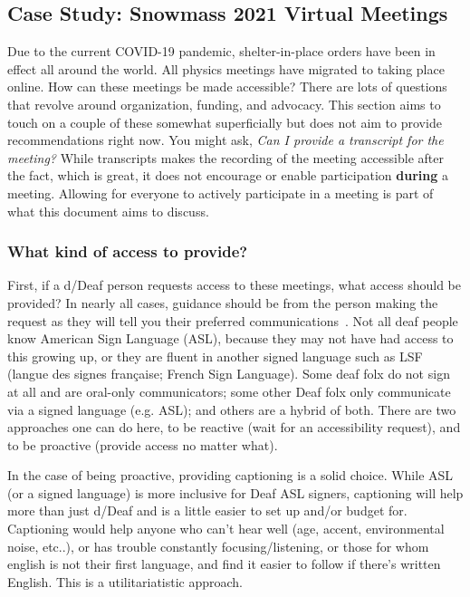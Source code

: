 \documentclass{article}
\begin{document}
  \subsection{Case Study: Snowmass 2021 Virtual Meetings}

  Due to the current COVID-19 pandemic, shelter-in-place orders have been in effect all around the world. All physics meetings have migrated to taking place online. How can these meetings be made accessible? There are lots of questions that revolve around organization, funding, and advocacy. This section aims to touch on a couple of these somewhat superficially but does not aim to provide recommendations right now. You might ask, \textsl{Can I provide a transcript for the meeting?} While transcripts makes the recording of the meeting accessible after the fact, which is great, it does not encourage or enable participation \textbf{during} a meeting. Allowing for everyone to actively participate in a meeting is part of what this document aims to discuss.

  \subsubsection{What kind of access to provide?}

  First, if a d/Deaf person requests access to these meetings, what access should be provided? In nearly all cases, guidance should be from the person making the request as they will tell you their preferred communications~\cite{chua2017behind}. Not all deaf people know American Sign Language (ASL), because they may not have had access to this growing up, or they are fluent in another signed language such as LSF (langue des signes française; French Sign Language). Some deaf folx do not sign at all and are oral-only communicators; some other Deaf folx only communicate via a signed language (e.g. ASL); and others are a hybrid of both. There are two approaches one can do here, to be reactive (wait for an accessibility request), and to be proactive (provide access no matter what).

  In the case of being proactive, providing captioning is a solid choice. While ASL (or a signed language) is more inclusive for Deaf ASL signers, captioning will help more than just d/Deaf and is a little easier to set up and/or budget for. Captioning would help anyone who can't hear well (age, accent, environmental noise, etc..), or has trouble constantly focusing/listening, or those for whom english is not their first language, and find it easier to follow if there's written English. This is a utilitariatistic approach.
\end{document}
